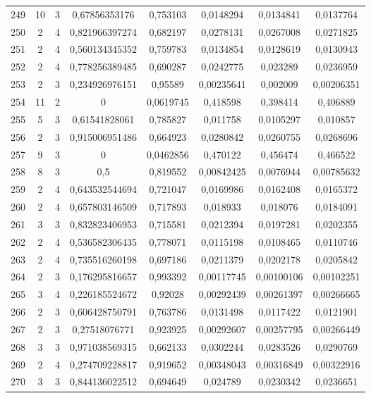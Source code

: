 \begin{longtable}{|c|c|c|c|c|c|c|c|}
249 & 10 & 3 & 0,67856353176 & 0,753103 & 0,0148294 & 0,0134841 & 0,0137764  \\
250 & 2 & 4 & 0,821966397274 & 0,682197 & 0,0278131 & 0,0267008 & 0,0271825  \\
251 & 2 & 4 & 0,560134345352 & 0,759783 & 0,0134854 & 0,0128619 & 0,0130943  \\
252 & 2 & 4 & 0,778256389485 & 0,690287 & 0,0242775 & 0,023289 & 0,0236959  \\
253 & 2 & 3 & 0,234926976151 & 0,95589 & 0,00235641 & 0,002009 & 0,00206351  \\
254 & 11 & 2 & 0 & 0,0619745 & 0,418598 & 0,398414 & 0,406889  \\
255 & 5 & 3 & 0,61541828061 & 0,785827 & 0,011758 & 0,0105297 & 0,010857  \\
256 & 2 & 3 & 0,915006951486 & 0,664923 & 0,0280842 & 0,0260755 & 0,0268696  \\
257 & 9 & 3 & 0 & 0,0462856 & 0,470122 & 0,456474 & 0,466522  \\
258 & 8 & 3 & 0,5 & 0,819552 & 0,00842425 & 0,0076944 & 0,00785632  \\
259 & 2 & 4 & 0,643532544694 & 0,721047 & 0,0169986 & 0,0162408 & 0,0165372  \\
260 & 2 & 4 & 0,657803146509 & 0,717893 & 0,018933 & 0,018076 & 0,0184091  \\
261 & 3 & 3 & 0,832823406953 & 0,715581 & 0,0212394 & 0,0197281 & 0,0202355  \\
262 & 2 & 4 & 0,536582306435 & 0,778071 & 0,0115198 & 0,0108465 & 0,0110746  \\
263 & 2 & 4 & 0,735516260198 & 0,697186 & 0,0211379 & 0,0202178 & 0,0205842  \\
264 & 2 & 3 & 0,176295816657 & 0,993392 & 0,00117745 & 0,00100106 & 0,00102251  \\
265 & 3 & 4 & 0,226185524672 & 0,92028 & 0,00292439 & 0,00261397 & 0,00266665  \\
266 & 2 & 3 & 0,606428750791 & 0,763786 & 0,0131498 & 0,0117422 & 0,0121901  \\
267 & 2 & 3 & 0,27518076771 & 0,923925 & 0,00292607 & 0,00257795 & 0,00266449  \\
268 & 3 & 3 & 0,971038569315 & 0,662133 & 0,0302244 & 0,0283526 & 0,0290769  \\
269 & 2 & 4 & 0,274709228817 & 0,919652 & 0,00348043 & 0,00316849 & 0,00322916  \\
270 & 3 & 3 & 0,844136022512 & 0,694649 & 0,024789 & 0,0230342 & 0,0236651  \\

\end{longtable}
